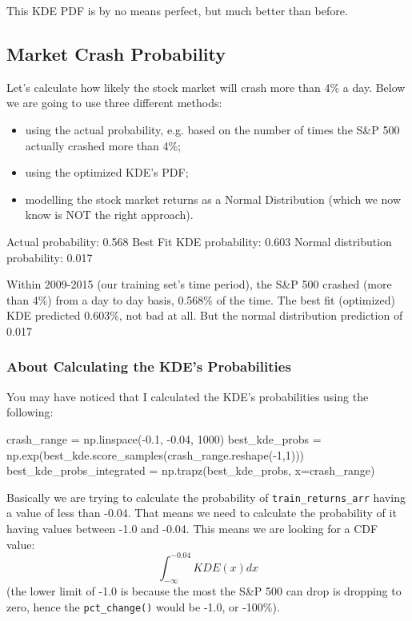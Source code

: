 This KDE PDF is by no means perfect, but much better than before.

\subsection{Market Crash Probability}

Let's calculate how likely the stock market will crash more than 4\% a day. Below we are going to use three different methods:
\begin{itemize}
\item using the actual probability, e.g. based on the number of times the S\&P 500 actually crashed more than 4\%;
\item using the optimized KDE's PDF;
\item modelling the stock market returns as a Normal Distribution (which we now know is NOT the right approach).
\end{itemize}

\begin{ioutput}
Actual probability:              0.568%
Best Fit KDE probability:        0.603%
Normal distribution probability: 0.017%
\end{ioutput}

Within 2009-2015 (our training set's time period), the S\&P 500 crashed (more than 4\%) from a day to day basis, 0.568\% of the time. The best fit (optimized) KDE predicted 0.603\%, not bad at all. But the normal distribution prediction of 0.017%

\subsubsection{About Calculating the KDE's Probabilities}

You may have noticed that I calculated the KDE's probabilities using the following:
\begin{ipythonnon}
crash_range = np.linspace(-0.1, -0.04, 1000)
best_kde_probs = np.exp(best_kde.score_samples(crash_range.reshape(-1,1)))
best_kde_probs_integrated = np.trapz(best_kde_probs, x=crash_range)
\end{ipythonnon}

Basically we are trying to calculate the probability of \texttt{train\_returns\_arr} having a value of less than -0.04. That means we need to calculate the probability of it having values between -1.0 and -0.04. This means we are looking for a CDF value:
\begin{equation}
\int_{-\infty}^{-0.04} KDE(x) dx
\end{equation}
(the lower limit of -1.0 is because the most the S\&P 500 can drop is dropping to zero, hence the \texttt{pct\_change()} would be -1.0, or -100\%).

